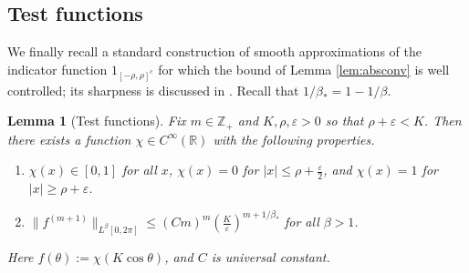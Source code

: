 \documentclass[10pt,reqno]{amsart}
\newtheorem{lem}[thm]{Lemma}
\theoremstyle{definition}
\theoremstyle{remark}
\numberwithin{equation}{section}
\numberwithin{figure}{section}
\numberwithin{table}{section}
\begin{document}
\subsection{Test functions}

We finally recall a standard construction of smooth approximations of the 
indicator function $1_{[-\rho,\rho]^c}$ for which the bound of Lemma 
\ref{lem:absconv} is well controlled; its sharpness is discussed in
\cite[pp.\ 19--22]{Hor03}. Recall that $1/\beta_*=1-1/\beta$.

\begin{lem}[Test functions]
\label{lem:test}
Fix $m\in\mathbb{Z}_+$ and $K,\rho,\varepsilon>0$ so that 
$\rho+\varepsilon<K$. Then there exists a function $\chi\in 
C^\infty(\mathbb{R})$ with the following properties.
\smallskip
\begin{enumerate}[leftmargin=*,label=\arabic*.]
\addtolength{\itemsep}{1.5mm}
\item $\chi(x)\in[0,1]$ for all $x$, 
$\chi(x)=0$ for $|x|\le\rho+\frac{\varepsilon}{2}$, and $\chi(x)=1$ for
$|x|\ge\rho+\varepsilon$.
\item $\|f^{(m+1)}\|_{L^\beta[0,2\pi]} \le (Cm)^m 
(\frac{K}{\varepsilon})^{m+1/\beta_*}$
for all $\beta>1$.
\end{enumerate}
\smallskip
Here $f(\theta):=\chi(K\cos\theta)$, and $C$ is universal constant.
\end{lem}
\end{document}

